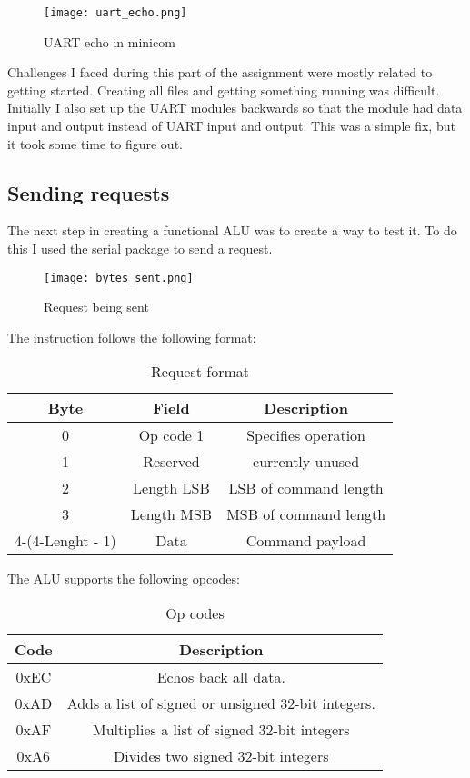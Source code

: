 \documentclass{article}
\begin{document}
\begin{figure}[h]
  \centering
  \texttt{[image: uart\_echo.png]}
  \caption{UART echo in minicom}
\end{figure}

Challenges I faced during this part of the assignment were mostly related to getting started. Creating all files and getting something running was difficult. Initially I also set up the UART modules backwards so that the module had data input and output instead of UART input and output. This was a simple fix, but it took some time to figure out. 
\subsection{Sending requests}

The next step in creating a functional ALU was to create a way to test it. To do this I used the serial package to send a request.

\begin{figure}[h]
  \centering
  \texttt{[image: bytes\_sent.png]}
  \caption{Request being sent}
\end{figure}

\newpage

The instruction follows the following format:
\begin{table}[h]
  \centering
  \begin{tabular}{|c|c|c|}
    \hline
    Byte & Field & Description\\
    \hline
    0 & Op code 1 & Specifies operation \\
    \hline
    1 & Reserved & currently unused \\
    \hline
    2 & Length LSB & LSB of command length \\
    \hline
    3 & Length MSB & MSB of command length \\
    \hline
    4-(4-Lenght - 1) & Data & Command payload \\
    \hline
  \end{tabular}
  \caption{Request format}
\end{table}

The ALU supports the following opcodes:
\begin{table}[h]
  \centering
  \begin{tabular}{|c|c|}
    \hline
    Code  & Description\\
    \hline
    0xEC & Echos back all data.  \\
    \hline
    0xAD & Adds a list of signed or unsigned 32-bit integers. \\
    \hline
    0xAF & Multiplies a list of signed 32-bit integers \\
    \hline
    0xA6 & Divides two signed 32-bit integers \\
    \hline
  \end{tabular}
  \caption{Op codes}
\end{table}
\end{document}
